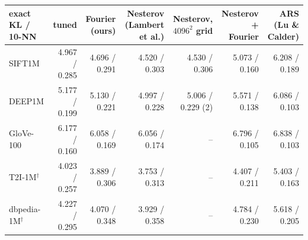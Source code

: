 \begin{tabular}{lrrrrrr}\toprule
exact KL / 10-NN & tuned & Fourier (ours) & Nesterov (Lambert et al.) & Nesterov, $4096^2$ grid & Nesterov + Fourier & ARS (Lu \& Calder)\\\midrule
SIFT1M & 4.967 / 0.285 & 4.696 / 0.291 & 4.520 / 0.303 & 4.530 / 0.306 & 5.073 / 0.160 & 6.208 / 0.189\\
DEEP1M & 5.177 / 0.199 & 5.130 / 0.221 & 4.997 / 0.228 & 5.006 / 0.229 (2) & 5.571 / 0.138 & 6.086 / 0.103\\
GloVe-100 & 6.177 / 0.160 & 6.058 / 0.169 & 6.056 / 0.174 & -- & 6.796 / 0.105 & 6.838 / 0.103\\
T2I-1M$^\dagger$ & 4.023 / 0.257 & 3.889 / 0.306 & 3.753 / 0.313 & -- & 4.407 / 0.211 & 5.403 / 0.163\\
dbpedia-1M$^\dagger$ & 4.227 / 0.295 & 4.070 / 0.348 & 3.929 / 0.358 & -- & 4.784 / 0.230 & 5.618 / 0.205\\
\bottomrule\end{tabular}
